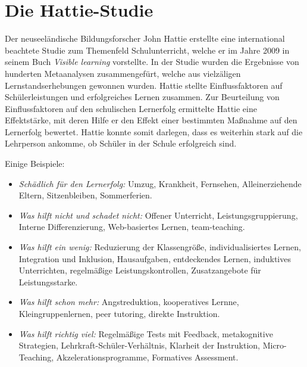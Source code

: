 \bip\bip
\section{Die Hattie-Studie}
Der neuseel{\"a}ndische Bildungsforscher John Hattie erstellte eine international beachtete Studie zum Themenfeld {\glqq}Schulunterricht{\grqq}, 
welche er im Jahre 2009 in seinem Buch \emph{Visible learning} vorstellte. In der Studie wurden die Ergebnisse von hunderten Metaanalysen zusammengef{\"u}rt,
welche aus vielz{\"a}ligen Lernstandserhebungen gewonnen wurden. Hattie stellte Einflussfaktoren auf Sch{\"u}lerleistungen und erfolgreiches Lernen zusammen. 
\mip
Zur Beurteilung von Einflussfaktoren auf den schulischen Lernerfolg ermittelte Hattie eine Effektst{\"a}rke, mit deren Hilfe er den Effekt einer 
bestimmten Ma{\ss}nahme auf den Lernerfolg bewertet. Hattie konnte somit darlegen, dass es weiterhin stark auf die Lehrperson ankomme, 
ob Sch{\"u}ler in der Schule erfolgreich sind.
\mip

Einige Beispiele:
\begin{itemize}
\item
{\emph{Sch{\"a}dlich f{\"u}r den Lernerfolg:}} Umzug, Krankheit, Fernsehen, Alleinerziehende Eltern, Sitzenbleiben, Sommerferien.
\item
{\emph{Was hilft nicht und schadet nicht:}} Offener Unterricht, Leistungsgruppierung, Interne Differenzierung, Web-basiertes Lernen, team-teaching.
\item
{\emph{Was hilft ein wenig:}} Reduzierung der Klassengr{\"o}{\ss}e, individualisiertes Lernen, Integration und Inklusion, Hausaufgaben, entdeckendes Lernen, induktives Unterrichten, regelm{\"a}{\ss}ige Leistungskontrollen, Zusatzangebote f{\"u}r Leistungsstarke.
\item
{\emph{Was hilft schon mehr:}} Angstreduktion, kooperatives Lernne, Kleingruppenlernen, peer tutoring, direkte Instruktion.
\item
{\emph{Was hilft richtig viel:}} Regelm{\"a}{\ss}ige Tests mit Feedback, metakognitive Strategien, Lehrkraft-Sch{\"u}ler-Verh{\"a}ltnis, Klarheit der Instruktion, Micro-Teaching, Akzelerationsprogramme, Formatives Assessment. 
\end{itemize}



